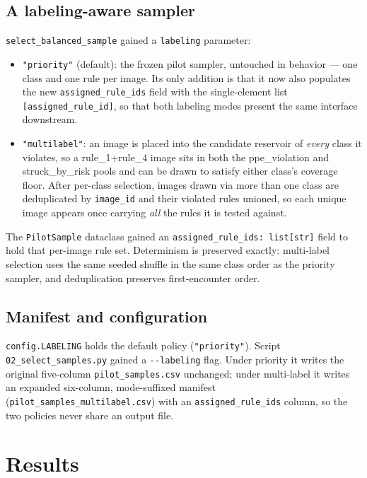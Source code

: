 \subsection{A labeling-aware sampler}

\texttt{select\_balanced\_sample} gained a \texttt{labeling} parameter:

\begin{itemize}
  \item \texttt{"priority"} (default): the frozen pilot sampler, untouched in behavior --- one class
  and one rule per image. Its only addition is that it now also populates the new
  \texttt{assigned\_rule\_ids} field with the single-element list \texttt{[assigned\_rule\_id]}, so
  that both labeling modes present the same interface downstream.
  \item \texttt{"multilabel"}: an image is placed into the candidate reservoir of \emph{every} class it
  violates, so a rule\_1+rule\_4 image sits in both the ppe\_violation and struck\_by\_risk pools and
  can be drawn to satisfy either class's coverage floor. After per-class selection, images drawn via
  more than one class are deduplicated by \texttt{image\_id} and their violated rules unioned, so each
  unique image appears once carrying \emph{all} the rules it is tested against.
\end{itemize}

The \texttt{PilotSample} dataclass gained an \texttt{assigned\_rule\_ids: list[str]} field to hold that
per-image rule set. Determinism is preserved exactly: multi-label selection uses the same seeded
shuffle in the same class order as the priority sampler, and deduplication preserves first-encounter
order.

\subsection{Manifest and configuration}

\texttt{config.LABELING} holds the default policy (\texttt{"priority"}). Script
\texttt{02\_select\_samples.py} gained a \texttt{-{}-labeling} flag. Under priority it writes the
original five-column \texttt{pilot\_samples.csv} unchanged; under multi-label it writes an expanded
six-column, mode-suffixed manifest (\texttt{pilot\_samples\_multilabel.csv}) with an
\texttt{assigned\_rule\_ids} column, so the two policies never share an output file.

\section{Results}

